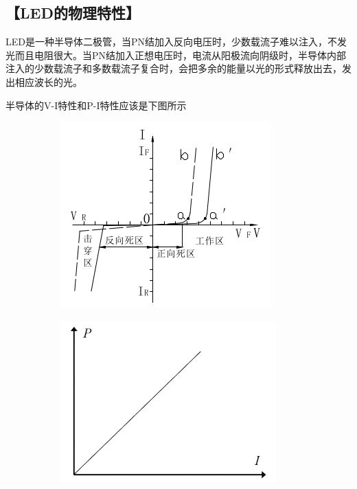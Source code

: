 \documentclass{ctexart}
\let\oldsubsection\subsection
\renewcommand{\subsection}[1]{\oldsubsection{\!\!\!\!\!\!【#1】}}
\begin{document}
\subsection{LED的物理特性}

LED是一种半导体二极管，当PN结加入反向电压时，少数载流子难以注入，不发光而且电阻很大。当PN结加入正想电压时，电流从阳极流向阴级时，半导体内部注入的少数载流子和多数载流子复合时，会把多余的能量以光的形式释放出去，发出相应波长的光。

半导体的V-I特性和P-I特性应该是下图所示

\begin{figure}[H]
  \centering
  \begin{subfigure}{.45\textwidth}
    \centering
    \includegraphics[width=\linewidth]{figures/LED的V-I特性}
  \end{subfigure}
  \begin{subfigure}{.45\textwidth}
    \centering
    \includegraphics[width=\linewidth]{figures/LED的P-I特性}
  \end{subfigure}
\end{figure}
\end{document}
